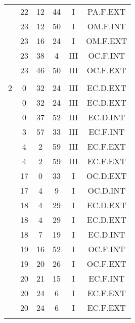 \documentclass[12pt, a4paper]{article}
\begin{document}
\begin{multicols}{3}
{\begin{tabular}{c c c c c c}
	 	 	 	 & 22 & 12 & 44 & I & PA.F.EXT\\%
	 	 	 	 & 23 & 12 & 50 & I & OM.F.INT\\%
	 	 	 	 & 23 & 16 & 24 & I & OM.F.EXT\\%
	 	 	 	 & 23 & 38 & 4 & III & OC.F.INT\\%
	 	 	 	 & 23 & 46 & 50 & III & OC.F.EXT\\%
	 	 	 	 & & & & & \\%
	 	 	 	2 & 0 & 32 & 24 & III & EC.D.EXT\\%
	 	 	 	 & 0 & 32 & 24 & III & EC.D.EXT\\%
	 	 	 	 & 0 & 37 & 52 & III & EC.D.INT\\%
	 	 	 	 & 3 & 57 & 33 & III & EC.F.INT\\%
	 	 	 	 & 4 & 2 & 59 & III & EC.F.EXT\\%
	 	 	 	 & 4 & 2 & 59 & III & EC.F.EXT\\%
	 	 	 	 & 17 & 0 & 33 & I & OC.D.EXT\\%
	 	 	 	 & 17 & 4 & 9 & I & OC.D.INT\\%
	 	 	 	 & 18 & 4 & 29 & I & EC.D.EXT\\%
	 	 	 	 & 18 & 4 & 29 & I & EC.D.EXT\\%
	 	 	 	 & 18 & 7 & 19 & I & EC.D.INT\\%
	 	 	 	 & 19 & 16 & 52 & I & OC.F.INT\\%
	 	 	 	 & 19 & 20 & 26 & I & OC.F.EXT\\%
	 	 	 	 & 20 & 21 & 15 & I & EC.F.INT\\%
	 	 	 	 & 20 & 24 & 6 & I & EC.F.EXT\\%
	 	 	 	 & 20 & 24 & 6 & I & EC.F.EXT\\%
	 	 	 	 & & & & & \\%

\end{tabular}}
\end{multicols}
\end{document}
